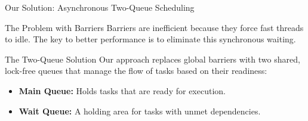 \begin{frame}{Our Solution: Asynchronous Two-Queue Scheduling}
  \vspace{-3mm}
  \begin{minipage}[c][\textheight][c]{0.45\textwidth}
    \vspace*{\fill}
    \begin{block}{The Problem with Barriers}
      Barriers are inefficient because they force fast threads to idle. The key to better performance is to eliminate this synchronous waiting.
    \end{block}

    \begin{alertblock}{The Two-Queue Solution}
      Our approach replaces global barriers with two shared, lock-free queues that manage the flow of tasks based on their readiness:
      \begin{itemize}
        \item \textbf{\alert{Main Queue}:} Holds tasks that are ready for execution.
        \item \textbf{\alert{Wait Queue}:} A holding area for tasks with unmet dependencies.
      \end{itemize}
    \end{alertblock}
    \vspace*{\fill}
  \end{minipage}
  \hfill
  \begin{minipage}[c][\textheight][c]{0.5\textwidth}
    \vspace*{\fill}
    \centering
\end{minipage}
\end{frame}
